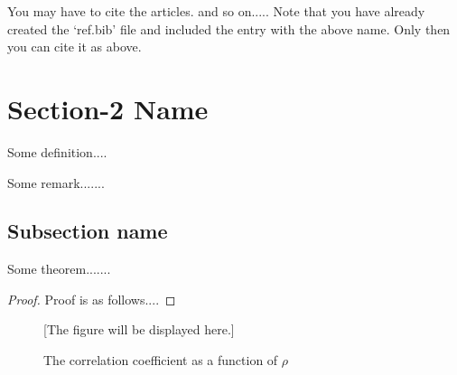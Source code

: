 You may have to cite the articles.   and so on.....
Note that you have already created the `ref.bib' file and included the entry with the above name. Only then you can cite it as above.  

\section{Section-2 Name}
\begin{definition}\label{abcd}
	Some definition....
\end{definition}

\begin{remark}
	Some remark.......
\end{remark}

\subsection{Subsection name}

\begin{theorem}
	Some theorem.......
\end{theorem}

\begin{proof}
	Proof is as follows....
\end{proof}


\begin{figure}[h]
	\label{fig1}
	[The figure will be displayed here.]
	
	\caption{The correlation coefficient as a function of $\rho$}
\end{figure}